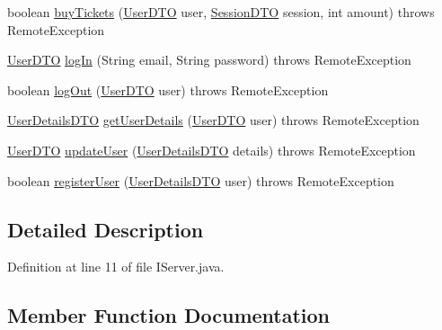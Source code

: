 \begin{DoxyCompactItemize}
boolean \mbox{\hyperlink{interfacees_1_1deusto_1_1server_1_1_i_server_ac3302c01fefc37a32c0bcbf79fcce44b}{buy\+Tickets}} (\mbox{\hyperlink{classes_1_1deusto_1_1server_1_1data_1_1_user_d_t_o}{User\+D\+TO}} user, \mbox{\hyperlink{classes_1_1deusto_1_1server_1_1data_1_1_session_d_t_o}{Session\+D\+TO}} session, int amount)  throws Remote\+Exception
\item 
\mbox{\hyperlink{classes_1_1deusto_1_1server_1_1data_1_1_user_d_t_o}{User\+D\+TO}} \mbox{\hyperlink{interfacees_1_1deusto_1_1server_1_1_i_server_a62db155ac744b9712e303ceea76a3560}{log\+In}} (String email, String password)  throws Remote\+Exception
\item 
boolean \mbox{\hyperlink{interfacees_1_1deusto_1_1server_1_1_i_server_a479231082cae13f9c651c0ec2cb2cece}{log\+Out}} (\mbox{\hyperlink{classes_1_1deusto_1_1server_1_1data_1_1_user_d_t_o}{User\+D\+TO}} user)  throws Remote\+Exception
\item 
\mbox{\hyperlink{classes_1_1deusto_1_1server_1_1data_1_1_user_details_d_t_o}{User\+Details\+D\+TO}} \mbox{\hyperlink{interfacees_1_1deusto_1_1server_1_1_i_server_a2dcd7f0b0e157eb797e20432c0b0e971}{get\+User\+Details}} (\mbox{\hyperlink{classes_1_1deusto_1_1server_1_1data_1_1_user_d_t_o}{User\+D\+TO}} user)  throws Remote\+Exception
\item 
\mbox{\hyperlink{classes_1_1deusto_1_1server_1_1data_1_1_user_d_t_o}{User\+D\+TO}} \mbox{\hyperlink{interfacees_1_1deusto_1_1server_1_1_i_server_aff376200af975b145ac85ccfdf48a229}{update\+User}} (\mbox{\hyperlink{classes_1_1deusto_1_1server_1_1data_1_1_user_details_d_t_o}{User\+Details\+D\+TO}} details)  throws Remote\+Exception
\item 
boolean \mbox{\hyperlink{interfacees_1_1deusto_1_1server_1_1_i_server_a998e20655e760b135fab601a417aa5ae}{register\+User}} (\mbox{\hyperlink{classes_1_1deusto_1_1server_1_1data_1_1_user_details_d_t_o}{User\+Details\+D\+TO}} user)  throws Remote\+Exception
\end{DoxyCompactItemize}


\subsection{Detailed Description}


Definition at line 11 of file I\+Server.\+java.



\subsection{Member Function Documentation}
\mbox{\label{interfacees_1_1deusto_1_1server_1_1_i_server_a393d8689e14b3534dfa425e4c900532e}} 
